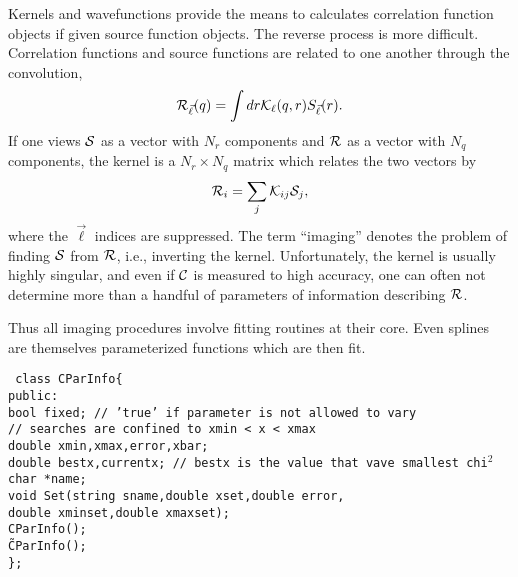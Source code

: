 \documentclass[10pt]{article}
\def\tab{\hspace*{9pt}}
\begin{document}
Kernels and wavefunctions provide the means to calculates correlation function objects if given source function objects. The reverse process is more difficult. Correlation functions and source functions are related to one another through the convolution,
\begin{equation}
{\cal R}_{\vec{\ell}}(q)=\int dr {\cal K}_{\ell}(q,r) S_{\vec{\ell}}(r).
\end{equation}
If one views ${\cal S}$  as a vector with $N_r$ components and ${\cal R}$ as a vector with $N_q$ components, the kernel is a $N_r\times N_q$ matrix which relates the two vectors by
\begin{equation}
{\cal R}_{i}=\sum_j {\cal K}_{ij} {\cal S}_j,
\end{equation}
where the ${\vec{\ell}}$ indices are suppressed. The term ``imaging'' denotes the problem of finding ${\cal S}$ from ${\cal R}$, i.e., inverting the kernel. Unfortunately, the kernel is usually highly singular, and even if ${\cal C}$ is measured to high accuracy, one can often not determine more than a handful of parameters of information describing ${\cal R}$. 

Thus all imaging procedures involve fitting routines at their core. Even splines are themselves parameterized functions which are then fit. 

{\tt
class CParInfo\{\\
\tab public:\\
\tab\tab  bool fixed; // 'true' if parameter is not allowed to vary\\
\tab\tab  // searches are confined to  xmin < x < xmax\\
\tab\tab  double xmin,xmax,error,xbar;\\
\tab\tab  double bestx,currentx; // bestx is the value that vave smallest chi$^2$\\
\tab\tab  char *name;\\
\tab\tab  void Set(string sname,double xset,double error,\\
\tab\tab	   double xminset,double xmaxset);\\
\tab\tab  CParInfo();\\
\tab\tab  \~CParInfo();\\
\};\\
}
\end{document}
